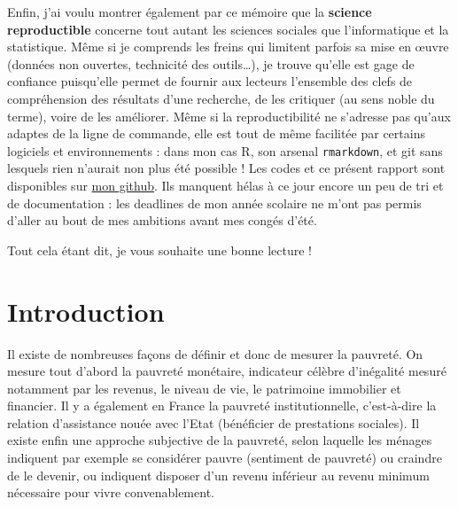 \documentclass[12pt,a4paper]{reedthesis}
\begin{document}
Enfin, j'ai voulu montrer également par ce mémoire que la \textbf{science reproductible} concerne tout autant les sciences sociales que l'informatique et la statistique. Même si je comprends les freins qui limitent parfois sa mise en œuvre (données non ouvertes, technicité des outils\ldots), je trouve qu'elle est gage de confiance puisqu'elle permet de fournir aux lecteurs l'ensemble des clefs de compréhension des résultats d'une recherche, de les critiquer (au sens noble du terme), voire de les améliorer. Même si la reproductibilité ne s'adresse pas qu'aux adaptes de la ligne de commande, elle est tout de même facilitée par certains logiciels et environnements : dans mon cas R, son arsenal \texttt{rmarkdown}, et git sans lesquels rien n'aurait non plus été possible ! Les codes et ce présent rapport sont disponibles sur \href{https://github.com/antuki/}{mon github}. Ils manquent hélas à ce jour encore un peu de tri et de documentation : les deadlines de mon année scolaire ne m'ont pas permis d'aller au bout de mes ambitions avant mes congés d'été.

Tout cela étant dit, je vous souhaite une bonne lecture !

\hypertarget{introduction}{%
\chapter*{Introduction}\label{introduction}}

Il existe de nombreuses façons de définir et donc de mesurer la pauvreté. On mesure tout d'abord la pauvreté monétaire, indicateur célèbre d'inégalité mesuré notamment par les revenus, le niveau de vie, le patrimoine immobilier et financier. Il y a également en France la pauvreté institutionnelle, c'est-à-dire la relation d'assistance nouée avec l'Etat (bénéficier de prestations sociales). Il existe enfin une approche subjective de la pauvreté, selon laquelle les ménages indiquent par exemple se considérer pauvre (sentiment de pauvreté) ou craindre de le devenir, ou indiquent disposer d'un revenu inférieur au revenu minimum nécessaire pour vivre convenablement.
\end{document}
